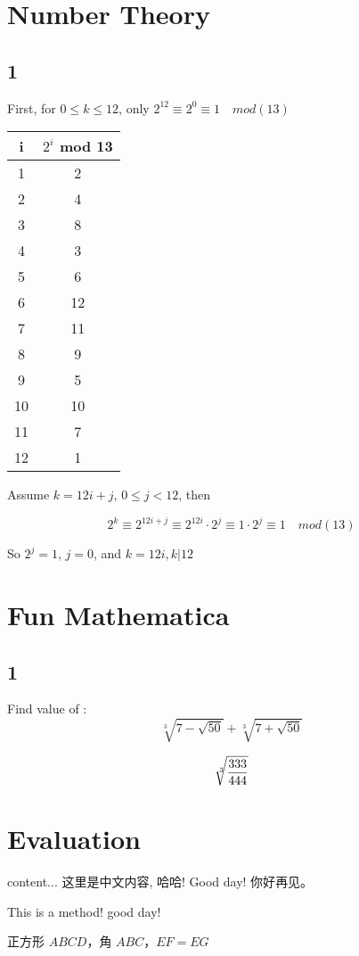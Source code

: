 \documentclass[11pt,a4paper]{article}
\begin{document}
\section{Number Theory}
\subsection{1}
First, for $0 \le k \le 12$, only $2^{12} \equiv 2^0 \equiv 1 \quad mod(13)$ 



\begin{tabular}{c|c}
	\hline
	\hline i & $2^i$ mod 13\\
	\hline
	 1&2 \\
	 2&4 \\
	 3&8 \\
	 4&3 \\
	 5&6 \\
	 6&12 \\
	 7&11 \\
	 8&9 \\
	 9&5 \\
	 10&10 \\
	 11&7 \\
	 12&1 \\
	
	\hline
\end{tabular}

Assume $k=12i+j$, $0 \le j < 12$, then

$$2^k \equiv 2^{12i+j} \equiv 2^{12i} \cdot 2^j \equiv 1\cdot 2^j \equiv 1 \quad mod(13)$$

So $2^j=1$, $j=0$, and $k=12i, k|12$

\section{Fun Mathematica}
\subsection{1}
Find value of : $$\sqrt[3]{7-\sqrt{50}} + \sqrt[3]{7+\sqrt{50}}$$

$$\sqrt[\leftroot{-3}\uproot{-3}3]{\dfrac{333}{444}}$$

\section{Evaluation}
\begin{CJK}{UTF8}{gbsn}
	content...
这里是中文内容, 哈哈! Good day!
你好\citep{abley2006operation}再见。

This is a method! good\citep{wang2010research} day!

正方形 $\mathit{ABCD}$，角 $\mathit{ABC}$，$\mathit{EF} = \mathit{EG}$

\end{CJK}
\end{document}
